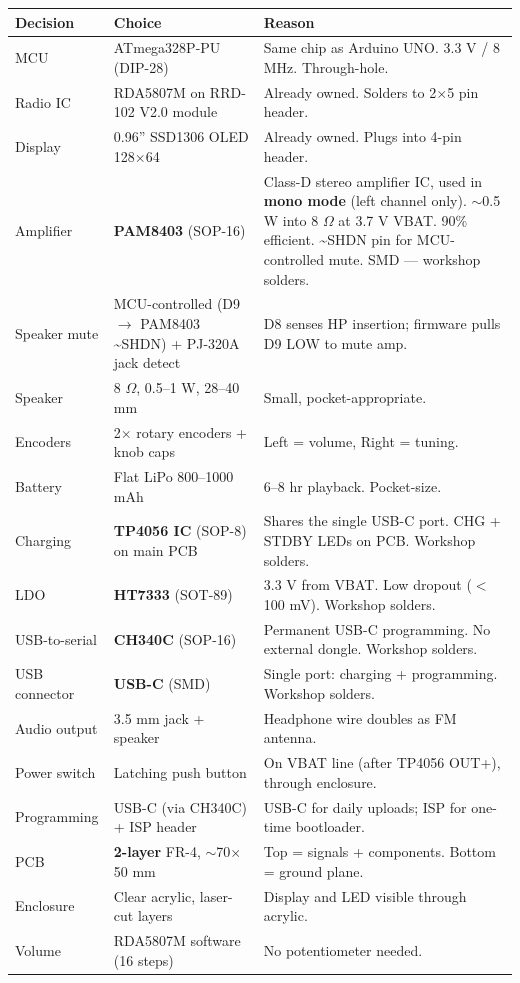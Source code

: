 \documentclass[a4paper,11pt]{article}
\renewcommand*{\,}{ }%
\begin{document}
\begin{longtable}{@{}p{3cm}p{5cm}p{6cm}@{}}
\toprule
\textbf{Decision} & \textbf{Choice} & \textbf{Reason} \\
\midrule
\endhead
MCU & ATmega328P-PU (DIP-28) & Same chip as Arduino UNO. 3.3\,V / 8\,MHz. Through-hole. \\
Radio IC & RDA5807M on RRD-102 V2.0 module & Already owned. Solders to 2$\times$5 pin header. \\
Display & 0.96'' SSD1306 OLED 128$\times$64 & Already owned. Plugs into 4-pin header. \\
Amplifier & \textbf{PAM8403} (SOP-16) & Class-D stereo amplifier IC, used in \textbf{mono mode} (left channel only). $\sim$0.5\,W into 8\,$\Omega$ at 3.7\,V VBAT. 90\% efficient. \textasciitilde{}SHDN pin for MCU-controlled mute. SMD --- workshop solders. \\
Speaker mute & MCU-controlled (D9 $\to$ PAM8403 \textasciitilde{}SHDN) + PJ-320A jack detect & D8 senses HP insertion; firmware pulls D9 LOW to mute amp. \\
Speaker & 8\,$\Omega$, 0.5--1\,W, 28--40\,mm & Small, pocket-appropriate. \\
Encoders & 2$\times$ rotary encoders + knob caps & Left = volume, Right = tuning. \\
Battery & Flat LiPo 800--1000\,mAh & 6--8\,hr playback. Pocket-size. \\
Charging & \textbf{TP4056 IC} (SOP-8) on main PCB & Shares the single USB-C port. CHG + STDBY LEDs on PCB. Workshop solders. \\
LDO & \textbf{HT7333} (SOT-89) & 3.3\,V from VBAT. Low dropout ($<$100\,mV). Workshop solders. \\
USB-to-serial & \textbf{CH340C} (SOP-16) & Permanent USB-C programming. No external dongle. Workshop solders. \\
USB connector & \textbf{USB-C} (SMD) & Single port: charging + programming. Workshop solders. \\
Audio output & 3.5\,mm jack + speaker & Headphone wire doubles as FM antenna. \\
Power switch & Latching push button & On VBAT line (after TP4056 OUT+), through enclosure. \\
Programming & USB-C (via CH340C) + ISP header & USB-C for daily uploads; ISP for one-time bootloader. \\
PCB & \textbf{2-layer} FR-4, $\sim$70$\times$50\,mm & Top = signals + components. Bottom = ground plane. \\
Enclosure & Clear acrylic, laser-cut layers & Display and LED visible through acrylic. \\
Volume & RDA5807M software (16 steps) & No potentiometer needed. \\
\bottomrule
\end{longtable}
\end{document}
